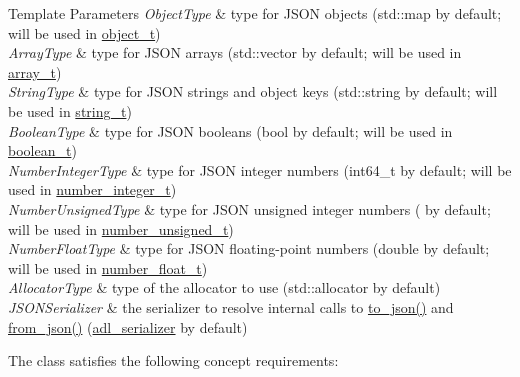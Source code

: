\begin{DoxyTemplParams}{Template Parameters}
{\em Object\+Type} & type for J\+S\+ON objects ({\ttfamily std\+::map} by default; will be used in \hyperlink{classnlohmann_1_1basic__json_a0322396ca5cd4623bc816bf735377623}{object\+\_\+t}) \\
\hline
{\em Array\+Type} & type for J\+S\+ON arrays ({\ttfamily std\+::vector} by default; will be used in \hyperlink{classnlohmann_1_1basic__json_a4c409f1b6d9caf3412c78af9a5883fed}{array\+\_\+t}) \\
\hline
{\em String\+Type} & type for J\+S\+ON strings and object keys ({\ttfamily std\+::string} by default; will be used in \hyperlink{classnlohmann_1_1basic__json_a61f8566a1a85a424c7266fb531dca005}{string\+\_\+t}) \\
\hline
{\em Boolean\+Type} & type for J\+S\+ON booleans ({\ttfamily bool} by default; will be used in \hyperlink{classnlohmann_1_1basic__json_a4c919102a9b4fe0d588af64801436082}{boolean\+\_\+t}) \\
\hline
{\em Number\+Integer\+Type} & type for J\+S\+ON integer numbers ({\ttfamily int64\+\_\+t} by default; will be used in \hyperlink{classnlohmann_1_1basic__json_a98e611d67b7bd75307de99c9358ab2dc}{number\+\_\+integer\+\_\+t}) \\
\hline
{\em Number\+Unsigned\+Type} & type for J\+S\+ON unsigned integer numbers ({} by default; will be used in \hyperlink{classnlohmann_1_1basic__json_ab906e29b5d83ac162e823ada2156b989}{number\+\_\+unsigned\+\_\+t}) \\
\hline
{\em Number\+Float\+Type} & type for J\+S\+ON floating-\/point numbers ({\ttfamily double} by default; will be used in \hyperlink{classnlohmann_1_1basic__json_a88d6103cb3620410b35200ee8e313d97}{number\+\_\+float\+\_\+t}) \\
\hline
{\em Allocator\+Type} & type of the allocator to use ({\ttfamily std\+::allocator} by default) \\
\hline
{\em J\+S\+O\+N\+Serializer} & the serializer to resolve internal calls to {\ttfamily \hyperlink{namespacenlohmann_1_1anonymous__namespace_02to__json_8hpp_03_a3cf8d817622a3ecdd3dcce222deb7535}{to\+\_\+json()}} and {\ttfamily \hyperlink{namespacenlohmann_1_1anonymous__namespace_02from__json_8hpp_03_a8da2cbc27f4ff99aff5c20428fbcce4c}{from\+\_\+json()}} (\hyperlink{structnlohmann_1_1adl__serializer}{adl\+\_\+serializer} by default)\\
\hline
\end{DoxyTemplParams}
The class satisfies the following concept requirements\+:
